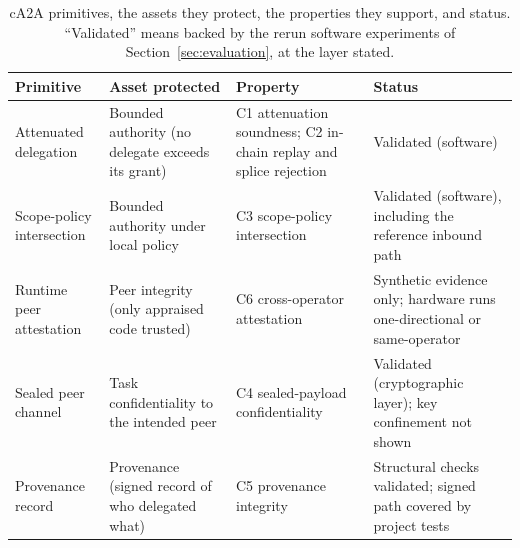 \begin{table}[h]
\centering
\caption{cA2A primitives, the assets they protect, the properties they support, and status.
``Validated'' means backed by the rerun software experiments of Section~\ref{sec:evaluation},
at the layer stated.}
\label{tab:primitives}
\small
\begin{tabular}{@{}>{\raggedright\arraybackslash}p{3.0cm}>{\raggedright\arraybackslash}p{3.4cm}>{\raggedright\arraybackslash}p{3.4cm}>{\raggedright\arraybackslash}p{3.4cm}@{}}
\toprule
\textbf{Primitive} & \textbf{Asset protected} & \textbf{Property} & \textbf{Status} \\
\midrule
Attenuated delegation & Bounded authority (no delegate exceeds its grant) &
  C1 attenuation soundness; C2 in-chain replay and splice rejection & Validated (software) \\
Scope-policy intersection & Bounded authority under local policy &
  C3 scope-policy intersection & Validated (software), including the reference inbound path \\
Runtime peer attestation & Peer integrity (only appraised code trusted) &
  C6 cross-operator attestation & Synthetic evidence only; hardware runs one-directional or same-operator \\
Sealed peer channel & Task confidentiality to the intended peer &
  C4 sealed-payload confidentiality & Validated (cryptographic layer); key confinement not shown \\
Provenance record & Provenance (signed record of who delegated what) &
  C5 provenance integrity & Structural checks validated; signed path covered by project tests \\
\bottomrule
\end{tabular}
\end{table}
